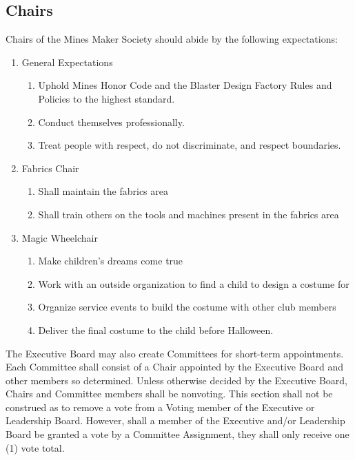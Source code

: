 \documentclass[12pt,letterpaper]{article}
\begin{document}
\subsection{Chairs}

Chairs of the Mines Maker Society should abide by the following expectations:

\begin{enumerate}
    \item General Expectations
    \begin{enumerate}
        \item Uphold Mines Honor Code and the Blaster Design Factory Rules and Policies to the highest standard. 
        \item Conduct themselves professionally.
        \item Treat people with respect, do not discriminate, and respect boundaries.
    \end{enumerate}

    \item Fabrics Chair
    \begin{enumerate}
        \item Shall maintain the fabrics area
        \item Shall train others on the tools and machines present in the fabrics area
    \end{enumerate}

    \item Magic Wheelchair
    \begin{enumerate}
        \item Make children’s dreams come true
        \item Work with an outside organization to find a child to design a costume for
        \item Organize service events to build the costume with other club members 
        \item Deliver the final costume to the child before Halloween.
    \end{enumerate}
\end{enumerate}

The Executive Board may also create Committees for short-term appointments. 
Each Committee shall consist of a Chair appointed by the Executive Board and other members so determined. 
Unless otherwise decided by the Executive Board, 
Chairs and Committee members shall be nonvoting. 
This section shall not be construed as to remove a vote from a Voting member of the Executive or Leadership Board. 
However, 
shall a member of the Executive and/or Leadership Board be granted a vote by a Committee Assignment, 
they shall only receive one (1) vote total.
\end{document}

